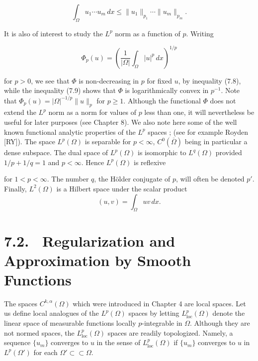 \begin{equation}
\int_{\Omega} u_1 \cdots u_m \, dx \le \|u_1\|_{p_1}\cdots\|u_m\|_{p_m}.
\tag{7.11}
\end{equation}

It is also of interest to study the $L^p$ norm as a function of $p$. Writing

\begin{equation}
\Phi_p(u) = \left(\frac{1}{|\Omega|}\int_{\Omega} |u|^p \, dx\right)^{1/p}
\tag{7.12}
\end{equation}

for $p > 0$, we see that $\Phi$ is non-decreasing in $p$ for fixed $u$, by inequality (7.8),
while the inequality (7.9) shows that $\Phi$ is logarithmically convex in $p^{-1}$. Note that
$\Phi_p(u) = |\Omega|^{-1/p}\|u\|_p$ for $p \ge 1$. Although the functional $\Phi$ does not extend the $L^p$
norm as a norm for values of $p$ less than one, it will nevertheless be useful for later
purposes (see Chapter 8).
We also note here some of the well known functional analytic properties of the
$L^p$ spaces ; (see for example Royden [RY]). The space $L^p(\Omega)$ is separable for
$p < \infty$, $C^0(\overline{\Omega})$ being in particular a dense subspace. The dual space of $L^p(\Omega)$ is
isomorphic to $L^q(\Omega)$ provided $1/p + 1/q = 1$ and $p < \infty$. Hence $L^p(\Omega)$ is reflexive


for $1 < p < \infty$. The number $q$, the Hölder conjugate of $p$, will often be denoted $p'$. Finally, $L^2(\Omega)$ is a Hilbert space under the scalar product
\[
(u,v) = \int_{\Omega} uv\,dx.
\]

\section*{7.2. \ Regularization and Approximation by Smooth Functions}

The spaces $C^{k,\alpha}(\Omega)$ which were introduced in Chapter 4 are local spaces. Let us define local analogues of the $L^p(\Omega)$ spaces by letting $L^p_{\mathrm{loc}}(\Omega)$ denote the linear space of measurable functions locally $p$-integrable in $\Omega$. Although they are not normed spaces, the $L^p_{\mathrm{loc}}(\Omega)$ spaces are readily topologized. Namely, a sequence $\{u_m\}$ converges to $u$ in the sense of $L^p_{\mathrm{loc}}(\Omega)$ if $\{u_m\}$ converges to $u$ in $L^p(\Omega')$ for each $\Omega' \subset\subset \Omega$.

